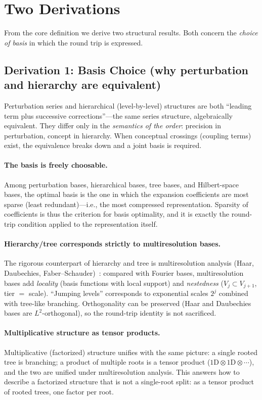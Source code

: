 \section{Two Derivations}
\label{sec:derivations}

From the core definition we derive two structural results. Both concern the
\emph{choice of basis} in which the round trip is expressed.

\subsection{Derivation 1: Basis Choice (why perturbation and hierarchy are equivalent)}
\label{sec:basis}

Perturbation series and hierarchical (level-by-level) structures are both
``leading term plus successive corrections''---the same series structure,
algebraically equivalent. They differ only in the \emph{semantics of the order}:
precision in perturbation, concept in hierarchy. When conceptual crossings
(coupling terms) exist, the equivalence breaks down and a joint basis is
required.

\paragraph{The basis is freely choosable.}
Among perturbation bases, hierarchical bases, tree bases, and Hilbert-space
bases, the optimal basis is the one in which the expansion coefficients are most
sparse (least redundant)---i.e., the most compressed representation. Sparsity of
coefficients is thus the criterion for basis optimality, and it is exactly the
round-trip condition applied to the representation itself.

\paragraph{Hierarchy/tree corresponds strictly to multiresolution bases.}
The rigorous counterpart of hierarchy and tree is multiresolution analysis
(Haar, Daubechies, Faber--Schauder)~\cite{mra_daubechies}: compared with
Fourier bases, multiresolution bases add \emph{locality} (basis functions with
local support) and \emph{nestedness} ($V_j \subset V_{j+1}$, tier $=$ scale).
``Jumping levels'' corresponds to exponential scales $2^{j}$ combined with
tree-like branching. Orthogonality can be preserved (Haar and Daubechies bases
are $L^{2}$-orthogonal), so the round-trip identity is not sacrificed.

\paragraph{Multiplicative structure as tensor products.}
Multiplicative (factorized) structure unifies with the same picture: a single
rooted tree is branching; a product of multiple roots is a tensor product
($1\mathrm{D}\otimes1\mathrm{D}\otimes\cdots$), and the two are unified under
multiresolution analysis. This answers how to describe a factorized structure
that is not a single-root split: as a tensor product of rooted trees, one
factor per root.

